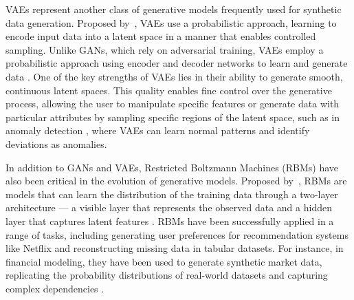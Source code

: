 \documentclass[11pt]{article}
\begin{document}
VAEs represent another class of generative models frequently used for synthetic data generation. Proposed by~\textcite{kingma_auto-encoding_2022}, VAEs use a probabilistic approach, learning to encode input data into a latent space in a manner that enables controlled sampling. Unlike GANs, which rely on adversarial training, VAEs  employ a probabilistic approach using encoder and decoder networks to learn and generate data \parencite{lu_machine_2024}. One of the key strengths of VAEs lies in their ability to generate smooth, continuous latent spaces. This quality enables fine control over the generative process, allowing the user to manipulate specific features or generate data with particular attributes by sampling specific regions of the latent space, such as in anomaly detection \parencite{niu_lstm-based_2020}, where VAEs can learn normal patterns and identify deviations as anomalies.

In addition to GANs and VAEs, Restricted Boltzmann Machines (RBMs) have also been critical in the evolution of generative models. Proposed by~\textcite{salakhutdinov_restricted_2007}, RBMs are models that can learn the distribution of the training data through a two-layer architecture — a visible layer that represents the observed data and a hidden layer that captures latent features \parencite{carvajal-patino_synthetic_2022}. RBMs have been successfully applied in a range of tasks, including generating user preferences for recommendation systems like Netflix \parencite{nematholahy_recommender_2020} and reconstructing missing data in tabular datasets. For instance, in financial modeling, they have been used to generate synthetic market data, replicating the probability distributions of real-world datasets and capturing complex dependencies \parencite{kondratyev_market_2019}.
\end{document}
